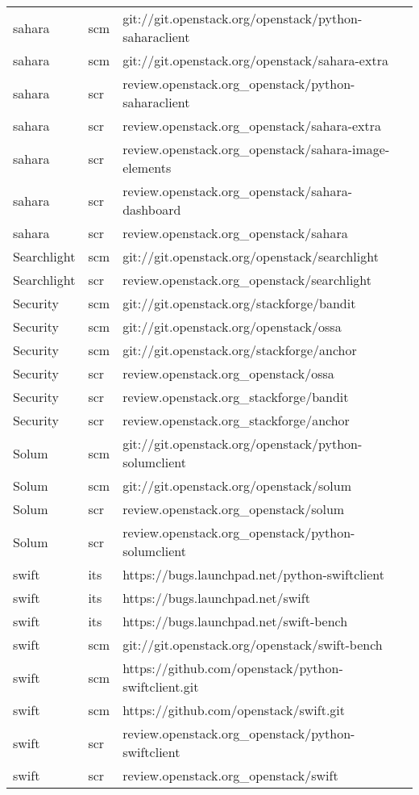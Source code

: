 \begin{center}
\begin{longtable}{|p{4cm}|p{1cm}|p{10cm}|}
sahara&scm&git://git.openstack.org/openstack/python-saharaclient\\ 
sahara&scm&git://git.openstack.org/openstack/sahara-extra\\ 
sahara&scr&review.openstack.org\_openstack/python-saharaclient\\ 
sahara&scr&review.openstack.org\_openstack/sahara-extra\\ 
sahara&scr&review.openstack.org\_openstack/sahara-image-elements\\ 
sahara&scr&review.openstack.org\_openstack/sahara-dashboard\\ 
sahara&scr&review.openstack.org\_openstack/sahara\\ 
Searchlight&scm&git://git.openstack.org/openstack/searchlight\\ 
Searchlight&scr&review.openstack.org\_openstack/searchlight\\ 
Security&scm&git://git.openstack.org/stackforge/bandit\\ 
Security&scm&git://git.openstack.org/openstack/ossa\\ 
Security&scm&git://git.openstack.org/stackforge/anchor\\ 
Security&scr&review.openstack.org\_openstack/ossa\\ 
Security&scr&review.openstack.org\_stackforge/bandit\\ 
Security&scr&review.openstack.org\_stackforge/anchor\\ 
Solum&scm&git://git.openstack.org/openstack/python-solumclient\\ 
Solum&scm&git://git.openstack.org/openstack/solum\\ 
Solum&scr&review.openstack.org\_openstack/solum\\ 
Solum&scr&review.openstack.org\_openstack/python-solumclient\\ 
swift&its&https://bugs.launchpad.net/python-swiftclient\\ 
swift&its&https://bugs.launchpad.net/swift\\ 
swift&its&https://bugs.launchpad.net/swift-bench\\ 
swift&scm&git://git.openstack.org/openstack/swift-bench\\ 
swift&scm&https://github.com/openstack/python-swiftclient.git\\ 
swift&scm&https://github.com/openstack/swift.git\\ 
swift&scr&review.openstack.org\_openstack/python-swiftclient\\ 
swift&scr&review.openstack.org\_openstack/swift\\ 

\end{longtable}
\end{center}
